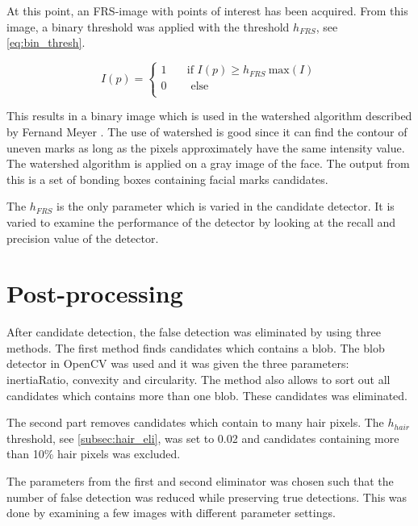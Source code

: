 At this point, an FRS-image with points of interest has been acquired. From this image, a binary threshold was applied with the threshold $h_{FRS}$, see \cref{eq:bin_thresh}.

\begin{equation} \label{eq:bin_thresh}
I(p) = 
\begin{cases}
1    & \quad \text{if } I(p) \geq h_{FRS} \: \text{max}(I) \\
0		& \quad  \text{ else}\\
\end{cases}
\end{equation}

This results in a binary image which is used in the watershed algorithm described by Fernand Meyer \cite{watershed}. The use of watershed is good since it can find the contour of uneven marks as long as the pixels approximately have the same intensity value. The watershed algorithm is applied on a gray image of the face. The output from this is a set of bonding boxes containing facial marks candidates.

The $h_{FRS}$ is the only parameter which is varied in the candidate detector. It is varied to examine the performance of the detector by looking at the recall and precision value of the detector. 

\section{Post-processing}

After candidate detection, the false detection was eliminated by using three methods. The first method finds candidates which contains a blob. The blob detector in OpenCV was used and it was given the three parameters: inertiaRatio, convexity and circularity. The method also allows to sort out all candidates which contains more than one blob. These candidates was eliminated. 


The second part removes candidates which contain to many hair pixels. The $h_{hair}$ threshold, see \cref{subsec:hair_eli}, was set to 0.02 and candidates containing more than 10\% hair pixels was excluded.

The parameters from the first and second eliminator was chosen such that the number of false detection was reduced while preserving true detections. This was done by examining a few images with different parameter settings. 

